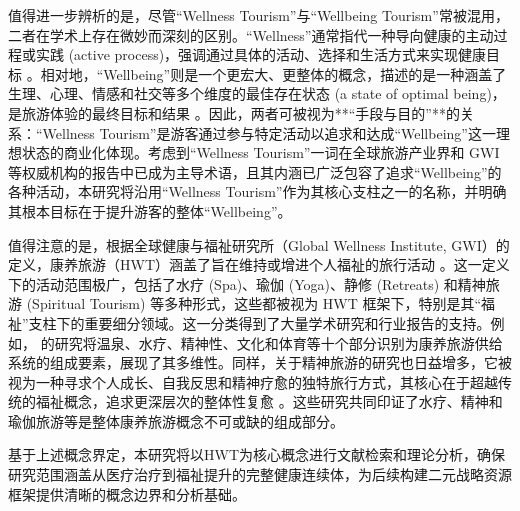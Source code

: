 \documentclass[UTF8, 12pt, a4paper, twoside]{ctexart}
\begin{document}
值得进一步辨析的是，尽管“Wellness Tourism”与“Wellbeing Tourism”常被混用，二者在学术上存在微妙而深刻的区别。“Wellness”通常指代一种导向健康的主动过程或实践 (active process)，强调通过具体的活动、选择和生活方式来实现健康目标 \parencite{pereira2023health}。相对地，“Wellbeing”则是一个更宏大、更整体的概念，描述的是一种涵盖了生理、心理、情感和社交等多个维度的最佳存在状态 (a state of optimal being)，是旅游体验的最终目标和结果 \parencite{kandanparakkalPhysicalMentalSpiritual2024, guerra2022new}。因此，两者可被视为**“手段与目的”**的关系：“Wellness Tourism”是游客通过参与特定活动以追求和达成“Wellbeing”这一理想状态的商业化体现。考虑到“Wellness Tourism”一词在全球旅游产业界和 GWI 等权威机构的报告中已成为主导术语，且其内涵已广泛包容了追求“Wellbeing”的各种活动，本研究将沿用“Wellness Tourism”作为其核心支柱之一的名称，并明确其根本目标在于提升游客的整体“Wellbeing”。

值得注意的是，根据全球健康与福祉研究所（Global Wellness Institute, GWI）的定义，康养旅游（HWT）涵盖了旨在维持或增进个人福祉的旅行活动 \parencite{pereira2023health}。这一定义下的活动范围极广，包括了水疗 (Spa)、瑜伽 (Yoga)、静修 (Retreats) 和精神旅游 (Spiritual Tourism) 等多种形式，这些都被视为 HWT 框架下，特别是其“福祉”支柱下的重要细分领域。这一分类得到了大量学术研究和行业报告的支持。例如，\textcite{dini2022wellness} 的研究将温泉、水疗、精神性、文化和体育等十个部分识别为康养旅游供给系统的组成要素，展现了其多维性。同样，关于精神旅游的研究也日益增多，它被视为一种寻求个人成长、自我反思和精神疗愈的独特旅行方式，其核心在于超越传统的福祉概念，追求更深层次的整体性复愈 \parencite{subramaniam2024capturing}。这些研究共同印证了水疗、精神和瑜伽旅游等是整体康养旅游概念不可或缺的组成部分。

基于上述概念界定，本研究将以HWT为核心概念进行文献检索和理论分析，确保研究范围涵盖从医疗治疗到福祉提升的完整健康连续体，为后续构建二元战略资源框架提供清晰的概念边界和分析基础。
\end{document}

